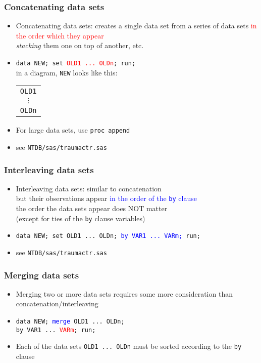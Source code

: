 \documentclass[11pt,pdftex,dvipsnames,usenames,helvetica]{beamer}
\begin{document}
\begin{frame}[fragile]
\frametitle{Concatenating data sets}
\begin{itemize}
\item Concatenating data sets: creates a single data set from a series
  of data sets \textcolor{red}{in the order which they appear}\\
{\it stacking} them one on top of another, etc.
\item {\tt data NEW; set \textcolor{red}{OLD1 ...\ OLDn}; run;}\\
in a diagram, {\tt NEW} looks like this:
\begin{tabular}{c}
{\tt OLD1} \\ 
$\vdots$ \\
{\tt OLDn} \\
\end{tabular}
\item For large data sets, use {\tt proc append}
\item see {\tt NTDB/sas/traumactr.sas}
\end{itemize}
\end{frame}

\begin{frame}[fragile]
\frametitle{Interleaving data sets}
\begin{itemize}
\item Interleaving data sets: similar to concatenation\\
  but their observations appear \textcolor{blue}{in the order of the {\tt by}
    clause}\\
the order the data sets appear does NOT matter\\
 (except for ties of the {\tt by} clause variables)
\item {\tt data NEW; set OLD1 ...\ OLDn; 
\textcolor{blue}{by VAR1 ...\ VARm;} run;}
\item see {\tt NTDB/sas/traumactr.sas}
\end{itemize}

\end{frame}

\begin{frame}[fragile]
\frametitle{Merging data sets}
\begin{itemize}
\item Merging two or more data sets requires some more consideration
than concatenation/interleaving
\item {\tt data NEW; \textcolor{blue}{merge} OLD1 ...\ OLDn;\\ 
{by VAR1 ...\ \textcolor{red}{VARm};} run;}
\item Each of the data sets {\tt OLD1 ...\ OLDn} must be sorted
according to the {\tt by} clause
\end{itemize}

\end{frame}
\end{document}
